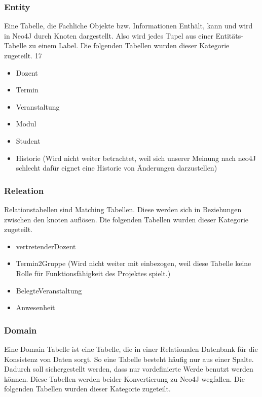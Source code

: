 \vspace{12pt}

\subsubsection{Entity}
Eine Tabelle, die Fachliche Objekte bzw. Informationen Enthält, kann und wird in Neo4J durch Knoten dargestellt. Also wird jedes Tupel aus einer Entitäts-Tabelle zu einem Label. Die folgenden Tabellen wurden dieser Kategorie zugeteilt.
17
\begin{itemize}
	\item Dozent
	\item Termin
	\item Veranstaltung
	\item Modul
	\item Student
	\item Historie (Wird nicht weiter betrachtet, weil sich unserer Meinung nach neo4J schlecht dafür eignet eine Historie von Änderungen darzustellen)
\end{itemize}

\vspace{12pt}

\subsubsection{Releation}
Relationstabellen sind Matching Tabellen. Diese werden sich in Beziehungen zwischen den knoten auflösen. Die folgenden Tabellen wurden dieser Kategorie zugeteilt.

\begin{itemize}
	\item vertretenderDozent
	\item Termin2Gruppe (Wird nicht weiter mit einbezogen, weil diese Tabelle keine Rolle für Funktionsfähigkeit des Projektes spielt.)
	\item BelegteVeranstaltung
	\item Anwesenheit
\end{itemize}

\vspace{12pt}

\subsubsection{Domain}
Eine Domain Tabelle ist eine Tabelle, die in einer Relationalen Datenbank für die Konsistenz von Daten sorgt. So eine Tabelle besteht häufig nur aus einer Spalte. Dadurch soll sichergestellt werden, dass nur vordefinierte Werde benutzt werden können. Diese Tabellen werden beider Konvertierung zu Neo4J wegfallen. Die folgenden Tabellen wurden dieser Kategorie zugeteilt.

